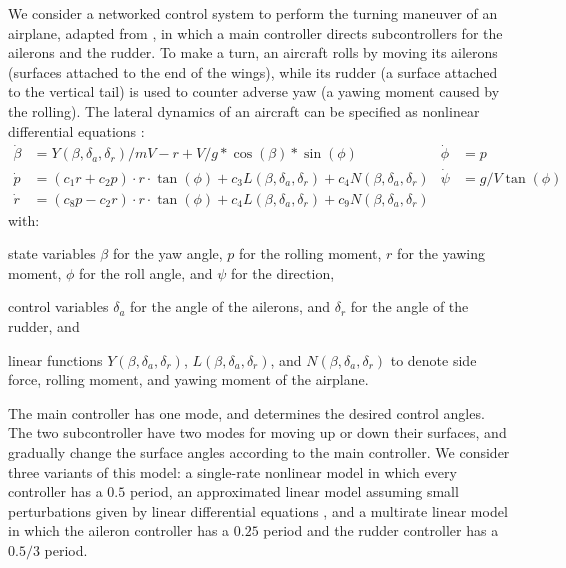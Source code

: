 We consider a networked control system
to perform the turning maneuver of an airplane,
adapted from \cite{ftscs-journal},
in which a main controller directs subcontrollers for the ailerons and the rudder.
%
To make a turn,
an aircraft rolls %
by moving its ailerons (surfaces attached to the end of the wings),
while its rudder (a surface attached to the vertical tail)
is used to counter adverse yaw
(a yawing moment %
caused by the rolling).
%
The lateral dynamics of an aircraft
can be specified as nonlinear differential equations
\cite{stevens2003aircraft}:
\[
\begin{aligned}
\dot{\beta} &= Y(\beta,\delta_a,\delta_r) / m V - r + V / g * \cos(\beta) * \sin(\phi)
&
\dot{\phi} &= p
\\
\dot{p} &= (c_1 r + c_2 p)\cdot r \cdot \tan(\phi) + c_3 L(\beta,\delta_a,\delta_r) + c_4 N(\beta,\delta_a,\delta_r)
&
\dot{\psi} &= g / V \tan(\phi)
\\
\dot{r} &= (c_8 p - c_2 r) \cdot r \cdot \tan(\phi) + c_4 L(\beta,\delta_a,\delta_r) + c_9 N(\beta,\delta_a,\delta_r)
\end{aligned}
\]
with:
\begin{inparaenum}[(i)]
	\item  state variables $\beta$ for the yaw angle, 
        $p$ for the rolling moment,
        $r$ for the yawing moment,
        $\phi$ for the roll angle, 
        and $\psi$ for the direction,
	\item control variables $\delta_a$ for the angle of the ailerons,
	and $\delta_r$ for the angle of the rudder,
	and
	\item 
	linear functions  
	$Y(\beta,\delta_a,\delta_r)$, $L(\beta,\delta_a,\delta_r)$, and $N(\beta,\delta_a,\delta_r)$
	to denote 
	side force, rolling moment, and yawing moment of the airplane.
\end{inparaenum}
%
The main controller has one mode,
and determines the desired control angles. %
The two subcontroller have two modes for moving up or down their surfaces,
and gradually change the surface angles according to the main controller.
%
We consider three variants of this model:
a single-rate nonlinear model
in which every controller has a $0.5$ period,
an approximated linear model
assuming small perturbations given by linear differential equations \cite{allerton2009principles}, and
a multirate linear model 
in which
the aileron controller has a $0.25$ period and the rudder controller has a $0.5/3$ period.


